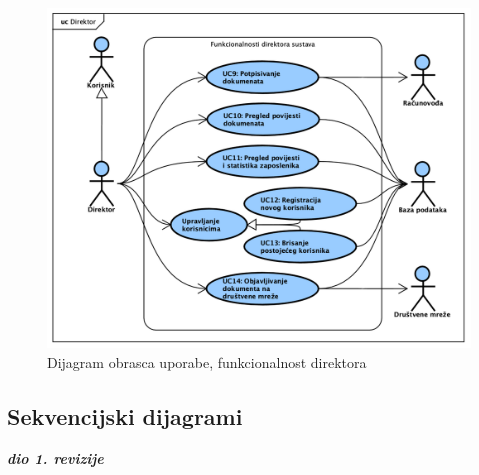 					\begin{figure}[H]
						\includegraphics[width=\textwidth]{slike/UseCase_Direktor.png}
						\caption{Dijagram obrasca uporabe, funkcionalnost direktora}
						\label{fig:usecase_direktor}
					\end{figure}
				\eject{}
				
			\subsection{Sekvencijski dijagrami}
				
				\textbf{\textit{dio 1. revizije}}\\

